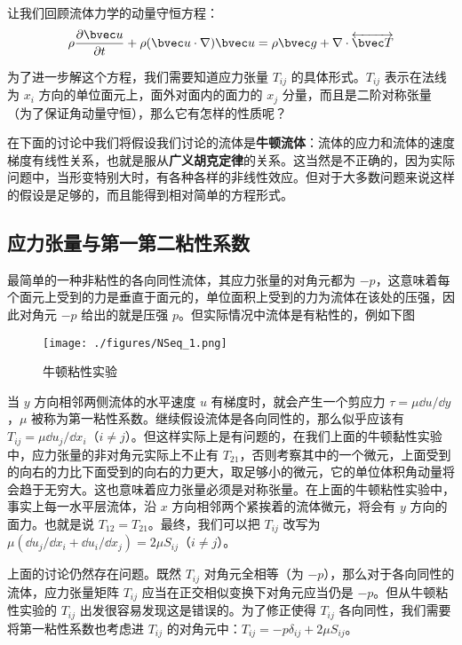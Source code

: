 
让我们回顾流体力学的动量守恒方程：
\begin{equation}
\rho \frac{\partial \bvec u}{\partial t}+\rho(\bvec u\cdot \nabla)\bvec u=\rho \bvec g+\nabla\cdot \overleftrightarrow {\bvec T}
\end{equation}

为了进一步解这个方程，我们需要知道应力张量 $T_{ij}$ 的具体形式。$T_{ij}$ 表示在法线为 $x_i$ 方向的单位面元上，面外对面内的面力的 $x_j$ 分量，而且是二阶对称张量（为了保证角动量守恒），那么它有怎样的性质呢？

在下面的讨论中我们将假设我们讨论的流体是\textbf{牛顿流体}：流体的应力和流体的速度梯度有线性关系，也就是服从\textbf{广义胡克定律}的关系。这当然是不正确的，因为实际问题中，当形变特别大时，有各种各样的非线性效应。但对于大多数问题来说这样的假设是足够的，而且能得到相对简单的方程形式。

\subsection{应力张量与第一第二粘性系数}
最简单的一种非粘性的各向同性流体，其应力张量的对角元都为 $-p$，这意味着每个面元上受到的力是垂直于面元的，单位面积上受到的力为流体在该处的压强，因此对角元 $-p$ 给出的就是压强 $p$。但实际情况中流体是有粘性的，例如下图
\begin{figure}[ht]
\centering
\texttt{[image: ./figures/NSeq\_1.png]}
\caption{牛顿粘性实验} \label{NSeq_fig1}
\end{figure}
当 $y$ 方向相邻两侧流体的水平速度 $u$ 有梯度时，就会产生一个剪应力 $\tau=\mu \dd u/\dd y$，$\mu$ 被称为第一粘性系数。继续假设流体是各向同性的，那么似乎应该有 $T_{ij}=\mu \dd u_j/\dd x_i$（$i\neq j$）。但这样实际上是有问题的，在我们上面的牛顿黏性实验中，应力张量的非对角元实际上不止有 $T_{21}$，否则考察其中的一个微元，上面受到的向右的力比下面受到的向右的力更大，取足够小的微元，它的单位体积角动量将会趋于无穷大。这也意味着应力张量必须是对称张量。在上面的牛顿粘性实验中，事实上每一水平层流体，沿 $x$ 方向相邻两个紧挨着的流体微元，将会有 $y$ 方向的面力。也就是说 $T_{12}=T_{21}$。最终，我们可以把 $T_{ij}$ 改写为 $\mu (\dd u_j/\dd x_i+\dd u_i/\dd x_j)=2\mu S_{ij}$（$i\neq j$）。

上面的讨论仍然存在问题。既然 $T_{ij}$ 对角元全相等（为 $-p$），那么对于各向同性的流体，应力张量矩阵 $T_{ij}$ 应当在正交相似变换下对角元应当仍是 $-p$。但从牛顿粘性实验的 $T_{ij}$ 出发很容易发现这是错误的。为了修正使得 $T_{ij}$ 各向同性，我们需要将第一粘性系数也考虑进 $T_{ij}$ 的对角元中：$T_{ij} = -p\delta_{ij}+2\mu S_{ij}$。

